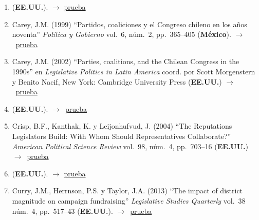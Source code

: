 \documentclass[12 pt, letter]{article}
\newenvironment{CitasMiTrabajo}{
    \begin{footnotesize}
    \begin{enumerate}[label={\footnotesize\emph{cita~\arabic*}},ref=\arabic*] %
        \setlength{\itemsep}{.1\itemsep}
        \setlength{\parskip}{.1\parskip}
    }{\end{enumerate}\end{footnotesize}}
\begin{document}
\begin{CitasMiTrabajo}
        \item {} (\textbf{EE.UU.}). $\rightarrow$ \href{https://github.com/emagar/cv/blob/master/citasMiTrab/mrs/calvo.guarnieri.limongi2015es.pdf}{prueba}
          
        \item Carey, J.M. (1999)
        ``Partidos, coaliciones y el Congreso chileno en los a\~nos noventa''
        \emph{Pol\'itica y Gobierno}
        vol.\ 6, n\'um.\ 2, pp.\ 365--405   (\textbf{M\'exico}). $\rightarrow$~\href{https://github.com/emagar/cv/blob/master/citasMiTrab/mrs/careyPartCongChile1999pyg.excerpt.pdf}{prueba}

        \item Carey, J.M. (2002)
        ``Parties, coalitions, and the Chilean Congress in the 1990s''
        en \emph{Legislative Politics in Latin America}
        coord. por Scott Morgenstern y Benito Nacif, New York: Cambridge
        University Press (\textbf{EE.UU.}) $\rightarrow$~\href{https://github.com/emagar/cv/blob/master/citasMiTrab/mrs/careyInMorgNacif.pdf}{prueba}

        \item {} (\textbf{EE.UU.}). $\rightarrow$~\href{https://www.cambridge.org/core/journals/american-political-science-review/article/positioning-under-alternative-electoral-systems-evidence-from-japanese-candidate-election-manifestos/D0D7EE4EEDBDEED88F6550AEA2841870}{prueba}
        
        \item Crisp, B.F., Kanthak, K. y Leijonhufvud, J. (2004)
        ``The Reputations Legislators Build: With Whom Should Representatives Collaborate?''
        \emph{American Political Science Review} vol.\ 98, n\'um.\ 4, pp.\ 703--16  (\textbf{EE.UU.}) $\rightarrow$~\href{https://github.com/emagar/cv/blob/master/citasMiTrab/mrs/crispEtAl.pdf}{prueba}

        \item {} (\textbf{EE.UU.}). $\rightarrow$ \href{https://www.jstor.org/stable/pdf/41289385.pdf?casa_token=fisv7eOzsM0AAAAA:G61AqOkHNF0CXNsFmtT74j6kSNVU49bcReM9WyGEEyl3FceeMtooQOmhIeNiRxucxQ5ZxDL_ixzHhkwnG4M4-_6YY5GcZIYGnQHuQ3ji5jSxlJ-O6DU}{prueba}
        
        \item Curry, J.M., Herrnson, P.S. y Taylor, J.A. (2013)
        ``The impact of district magnitude on campaign fundraising''
        \emph{Legislative Studies Quarterly} vol.\ 38 n\'um.\ 4, pp.\ 517--43 (\textbf{EE.UU.}). $\rightarrow$~\href{https://github.com/emagar/cv/blob/master/citasMiTrab/mrs/curryEtAl2013lsq.excerpts.pdf}{prueba}


\end{CitasMiTrabajo}
\end{document}
